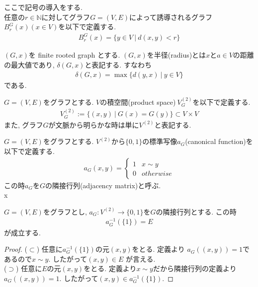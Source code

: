 \documentclass[11pt, a4paper, dvipdfmx]{jsarticle}
\theoremstyle{definition}
\newtheorem*[S]{Definition+}[Axiom+]{Definition}
\newtheorem[S]{Theorem+}[Axiom+]{Theorem}
\newtheorem[S]{Proposition+}[Axiom+]{Proposition}
\newtheorem[S]{newch+}{Newcharactor}
\newcommand{\N}{\mathbb{N}}
\begin{document}
ここで記号の導入をする.\\
任意の$r\in\N$に対してグラフ$G = (V, E)$によって誘導されるグラフ$B_{r}^{G}(x) (x\in V)$を以下で定義する.
\begin{align*}
    B_{r}^{G}(x) = \{y\in V~|~ d(x, y) < r\}
\end{align*}
\begin{Definition+}[半径]
    $(G, x)$を finite rooted graph とする. $(G, x)$を半径(radius)とは$x$と$a\in V$の距離の最大値であり, $\delta(G, x)$と表記する. すなわち
    \begin{align*}
        \delta(G, x) =\max\{d(y, x)~|~ y\in V\}
    \end{align*}
     である.
\end{Definition+}
\begin{Definition+}[積空間]
    $G = (V, E)$をグラフとする. $V$の積空間(product space)$~V_{G}^{(2)}$を以下で定義する.
    \begin{align*}
        V_{G}^{(2)} := \{(x, y)~|~ G(x) = G(y)\}\subset V\times V
    \end{align*}
    また, グラフ$G$が文脈から明らかな時は単に$V^{(2)}$と表記する.
\end{Definition+}
\begin{Definition+}[隣接行列]
    $G = (V, E)$をグラフとする. $V^{(2)}$から$\{0, 1\}$の標準写像$a_{G}$(canonical function)を以下で定義する.
    \begin{align*}
        a_{G}(x, y) = 
        \begin{cases}
            1 & x\sim y\\
            0 & otherwise
        \end{cases}
    \end{align*}
    この時$a_{G}$を$G$の隣接行列(adjacency matrix)と呼ぶ.\\x
\end{Definition+}
\begin{Proposition+}
    $G = (V, E)$をグラフとし, $a_{G}: V^{(2)}\to \{0, 1\}$を$G$の隣接行列とする. この時
    \begin{align*}
        a_{G}^{-1}(\{1\}) = E
    \end{align*}
    が成立する.
\end{Proposition+}
\begin{proof}
    ($\subset$) 任意に$a_{G}^{-1}(\{1\})$の元$(x, y)$をとる. 定義より
    $a_{G}((x, y)) = 1$であるので$x\sim y$. したがって$(x, y)\in E$ 
    が言える.\\
    ($\supset$) 任意に$E$の元$(x, y)$をとる. 定義より$x\sim y$だから隣接行列の定義より
    $a_{G}((x, y)) = 1$. したがって$(x, y)\in a_{G}^{-1}(\{1\})$. 
\end{proof}
\end{document}
